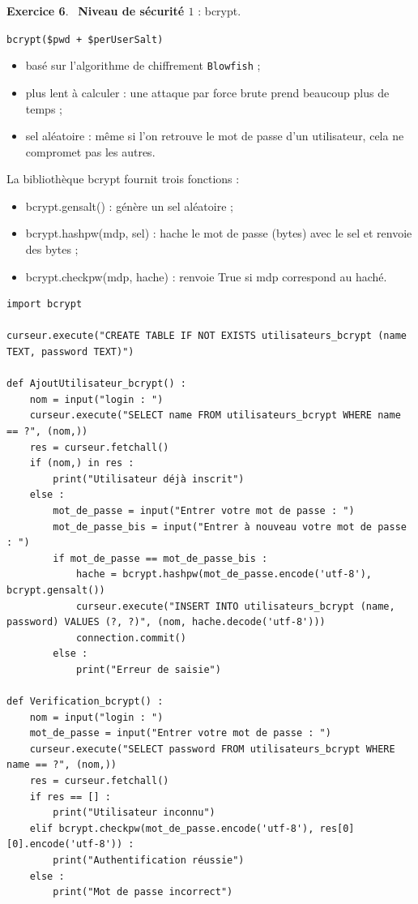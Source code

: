 \documentclass[11pt,a4paper]{article}
\newcommand{\code}[1]{\colorbox{fondcode}{\ttfamily\small #1}}
\newcommand{\exo}[1]{\par\medskip\textbf{Exercice #1}.\ }
\begin{document}
\exo{6} \textbf{Niveau de sécurité $1$} : \code{bcrypt}.

\begin{rappel}[Cours]
\texttt{bcrypt(\$pwd + \$perUserSalt)}
\begin{itemize}
  \item basé sur l'algorithme de chiffrement \texttt{Blowfish} ;
  \item plus lent à calculer : une attaque par force brute prend beaucoup plus de temps ;
  \item sel aléatoire : même si l'on retrouve le mot de passe d'un utilisateur, cela ne compromet pas les autres.
\end{itemize}
\end{rappel}

La bibliothèque \code{bcrypt} fournit trois fonctions :
\begin{itemize}
  \item \code{bcrypt.gensalt()} : génère un sel aléatoire ;
  \item \code{bcrypt.hashpw(mdp, sel)} : hache le mot de passe (\code{bytes}) avec le sel et renvoie des \code{bytes} ;
  \item \code{bcrypt.checkpw(mdp, hache)} : renvoie \code{True} si \code{mdp} correspond au haché.
\end{itemize}

\begin{lstlisting}
import bcrypt

curseur.execute("CREATE TABLE IF NOT EXISTS utilisateurs_bcrypt (name TEXT, password TEXT)")

def AjoutUtilisateur_bcrypt() :
    nom = input("login : ")
    curseur.execute("SELECT name FROM utilisateurs_bcrypt WHERE name == ?", (nom,))
    res = curseur.fetchall()
    if (nom,) in res :
        print("Utilisateur déjà inscrit")
    else :
        mot_de_passe = input("Entrer votre mot de passe : ")
        mot_de_passe_bis = input("Entrer à nouveau votre mot de passe : ")
        if mot_de_passe == mot_de_passe_bis :
            hache = bcrypt.hashpw(mot_de_passe.encode('utf-8'), bcrypt.gensalt())
            curseur.execute("INSERT INTO utilisateurs_bcrypt (name, password) VALUES (?, ?)", (nom, hache.decode('utf-8')))
            connection.commit()
        else :
            print("Erreur de saisie")

def Verification_bcrypt() :
    nom = input("login : ")
    mot_de_passe = input("Entrer votre mot de passe : ")
    curseur.execute("SELECT password FROM utilisateurs_bcrypt WHERE name == ?", (nom,))
    res = curseur.fetchall()
    if res == [] :
        print("Utilisateur inconnu")
    elif bcrypt.checkpw(mot_de_passe.encode('utf-8'), res[0][0].encode('utf-8')) :
        print("Authentification réussie")
    else :
        print("Mot de passe incorrect")
\end{lstlisting}
\end{document}
